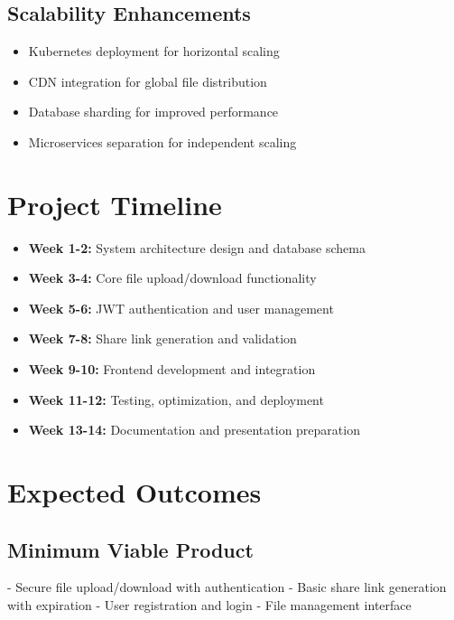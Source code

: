 \documentclass[final]{cvpr}
\begin{document}
\subsection{Scalability Enhancements}
\begin{itemize}
    \item Kubernetes deployment for horizontal scaling
    \item CDN integration for global file distribution
    \item Database sharding for improved performance
    \item Microservices separation for independent scaling
\end{itemize}

\section{Project Timeline}

\begin{itemize}
    \item \textbf{Week 1-2:} System architecture design and database schema
    \item \textbf{Week 3-4:} Core file upload/download functionality
    \item \textbf{Week 5-6:} JWT authentication and user management
    \item \textbf{Week 7-8:} Share link generation and validation
    \item \textbf{Week 9-10:} Frontend development and integration
    \item \textbf{Week 11-12:} Testing, optimization, and deployment
    \item \textbf{Week 13-14:} Documentation and presentation preparation
\end{itemize}

\section{Expected Outcomes}

\subsection{Minimum Viable Product}
- Secure file upload/download with authentication
- Basic share link generation with expiration
- User registration and login
- File management interface
\end{document}
